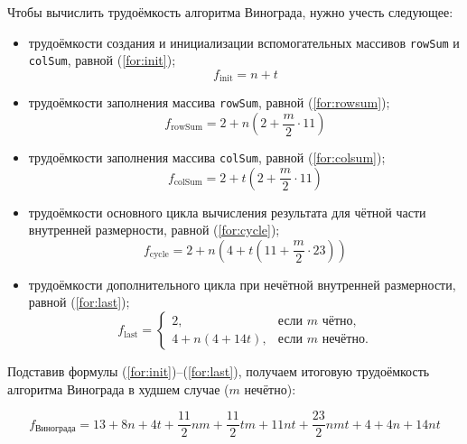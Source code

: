Чтобы вычислить трудоёмкость алгоритма Винограда, нужно учесть следующее:
\begin{itemize}
	
	\item[---] трудоёмкости создания и инициализации вспомогательных массивов \texttt{rowSum} и \texttt{colSum}, равной (\ref{for:init});
	\begin{equation}
		\label{for:init}
		f_{\mathrm{init}} = n + t
	\end{equation}
	
	\item[---] трудоёмкости заполнения массива \texttt{rowSum}, равной (\ref{for:rowsum});
	\begin{equation}
		\label{for:rowsum}
		f_{\mathrm{rowSum}} = 2 + n \left( 2 + \frac{m}{2} \cdot 11 \right)
	\end{equation}
	
	\item[---] трудоёмкости заполнения массива \texttt{colSum}, равной (\ref{for:colsum});
	\begin{equation}
		\label{for:colsum}
		f_{\mathrm{colSum}} = 2 + t \left( 2 + \frac{m}{2} \cdot 11 \right)
	\end{equation}
	
	\item[---] трудоёмкости основного цикла вычисления результата для чётной части внутренней размерности, равной (\ref{for:cycle});
	\begin{equation}
		\label{for:cycle}
		f_{\mathrm{cycle}} = 2 + n \left( 4 + t \left( 11 + \frac{m}{2} \cdot 23 \right) \right)
	\end{equation}
	
	\item[---] трудоёмкости дополнительного цикла при нечётной внутренней размерности, равной (\ref{for:last});
	\begin{equation}
		\label{for:last}
		f_{\mathrm{last}} =
		\begin{cases}
			2, & \text{если } m \text{ чётно}, \\
			4 + n \left( 4 + 14t \right), & \text{если } m \text{ нечётно}.
		\end{cases}
	\end{equation}
\end{itemize}

Подставив формулы (\ref{for:init})–(\ref{for:last}), получаем итоговую трудоёмкость алгоритма Винограда в худшем случае (\( m \) нечётно):

\begin{equation}
	\label{for:vinograd_full}
	f_{\text{Винограда}} = 13 + 8n + 4t + \frac{11}{2}nm + \frac{11}{2}tm + 11nt + \frac{23}{2}nmt + 4 + 4n + 14nt
\end{equation}

